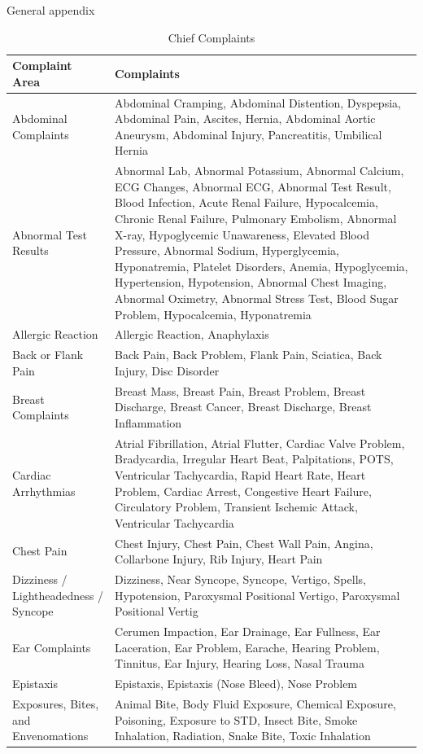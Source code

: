 \documentclass[,,nonblindrev]{informs}
\begin{document}
\begin{APPENDIX}{General appendix}
\begin{longtable}{|p{5cm}|p{12cm}|}
\caption{Chief Complaints} \\
\hline
\textbf{Complaint Area} & \textbf{Complaints} \\
\hline
Abdominal Complaints & Abdominal Cramping, Abdominal Distention, Dyspepsia, Abdominal Pain, Ascites, Hernia, Abdominal Aortic Aneurysm, Abdominal Injury, Pancreatitis, Umbilical Hernia \\
\hline
Abnormal Test Results & Abnormal Lab, Abnormal Potassium, Abnormal Calcium, ECG Changes, Abnormal ECG, Abnormal Test Result, Blood Infection, Acute Renal Failure, Hypocalcemia, Chronic Renal Failure, Pulmonary Embolism, Abnormal X-ray, Hypoglycemic Unawareness, Elevated Blood Pressure, Abnormal Sodium, Hyperglycemia, Hyponatremia, Platelet Disorders, Anemia, Hypoglycemia, Hypertension, Hypotension, Abnormal Chest Imaging, Abnormal Oximetry, Abnormal Stress Test, Blood Sugar Problem, Hypocalcemia, Hyponatremia \\
\hline
Allergic Reaction & Allergic Reaction, Anaphylaxis \\
\hline
Back or Flank Pain & Back Pain, Back Problem, Flank Pain, Sciatica, Back Injury, Disc Disorder \\
\hline
Breast Complaints & Breast Mass, Breast Pain, Breast Problem, Breast Discharge, Breast Cancer, Breast Discharge, Breast Inflammation \\
\hline
Cardiac Arrhythmias & Atrial Fibrillation, Atrial Flutter, Cardiac Valve Problem, Bradycardia, Irregular Heart Beat, Palpitations, POTS, Ventricular Tachycardia, Rapid Heart Rate, Heart Problem, Cardiac Arrest, Congestive Heart Failure, Circulatory Problem, Transient Ischemic Attack, Ventricular Tachycardia \\
\hline
Chest Pain & Chest Injury, Chest Pain, Chest Wall Pain, Angina, Collarbone Injury, Rib Injury, Heart Pain \\
\hline
Dizziness / Lightheadedness / Syncope & Dizziness, Near Syncope, Syncope, Vertigo, Spells, Hypotension, Paroxysmal Positional Vertigo, Paroxysmal Positional Vertig \\
\hline
Ear Complaints & Cerumen Impaction, Ear Drainage, Ear Fullness, Ear Laceration, Ear Problem, Earache, Hearing Problem, Tinnitus, Ear Injury, Hearing Loss, Nasal Trauma \\
\hline
Epistaxis & Epistaxis, Epistaxis (Nose Bleed), Nose Problem \\
\hline
Exposures, Bites, and Envenomations & Animal Bite, Body Fluid Exposure, Chemical Exposure, Poisoning, Exposure to STD, Insect Bite, Smoke Inhalation, Radiation, Snake Bite, Toxic Inhalation \\

\end{longtable}
\end{APPENDIX}
\end{document}
